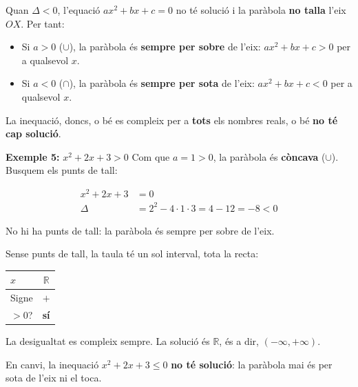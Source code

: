 Quan $\Delta<0$, l'equació $ax^2+bx+c=0$ no té solució i la paràbola \textbf{no talla} l'eix $OX$. Per tant:

\begin{itemize}
\item Si $a>0$ ($\cup$), la paràbola és \textbf{sempre per sobre} de l'eix: $ax^2+bx+c>0$ per a qualsevol $x$.
\item Si $a<0$ ($\cap$), la paràbola és \textbf{sempre per sota} de l'eix: $ax^2+bx+c<0$ per a qualsevol $x$.
\end{itemize}

La inequació, doncs, o bé es compleix per a \textbf{tots} els nombres reals, o bé \textbf{no té cap solució}.

\begin{exemple}{\textbf{Exemple 5:} $x^2+2x+3>0$}
Com que $a=1>0$, la paràbola és \textbf{còncava} ($\cup$). Busquem els punts de tall:

\[
\begin{aligned}
x^2+2x+3&=0\\
\Delta&=2^2-4\cdot 1\cdot 3=4-12=-8<0
\end{aligned}
\]

No hi ha punts de tall: la paràbola és sempre per sobre de l'eix.

\begin{center}
\end{center}

Sense punts de tall, la taula té un sol interval, tota la recta:

\begin{center}
\begin{tabular}{lc}
\toprule
$x$ & $\mathbb{R}$ \\
\midrule
Signe & $+$ \\
$>0$? & \textbf{sí} \\
\bottomrule
\end{tabular}
\end{center}

La desigualtat es compleix sempre. La solució és $\mathbb{R}$, és a dir, $(-\infty,+\infty)$.

En canvi, la inequació $x^2+2x+3\leq 0$ \textbf{no té solució}: la paràbola mai és per sota de l'eix ni el toca.
\end{exemple}

